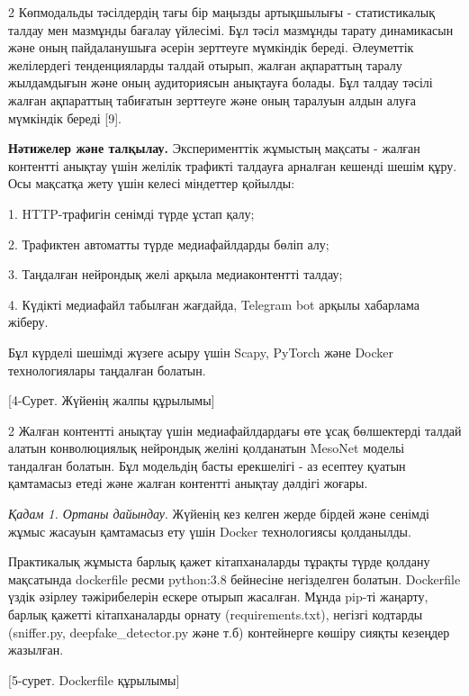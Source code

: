 \begin{multicols}{2}
Көпмодальды тәсілдердің тағы бір маңызды артықшылығы - статистикалық
талдау мен мазмұнды бағалау үйлесімі. Бұл тәсіл мазмұнды тарату
динамикасын және оның пайдаланушыға әсерін зерттеуге мүмкіндік береді.
Әлеуметтік желілердегі тенденцияларды талдай отырып, жалған ақпараттың
таралу жылдамдығын және оның аудиториясын анықтауға болады. Бұл талдау
тәсілі жалған ақпараттың табиғатын зерттеуге және оның таралуын алдын
алуға мүмкіндік береді {[}9{]}.

{\bfseries Нәтижелер және талқылау.} Эксперименттік жұмыстың мақсаты -
жалған контентті анықтау үшін желілік трафикті талдауға арналған кешенді
шешім құру. Осы мақсатқа жету үшін келесі міндеттер қойылды:

1. HTTP-трафигін сенімді түрде ұстап қалу;

2. Трафиктен автоматты түрде медиафайлдарды бөліп алу;

3. Таңдалған нейрондық желі арқыла медиаконтентті талдау;

4. Күдікті медиафайл табылған жағдайда, Telegram bot арқылы хабарлама
жіберу.

Бұл күрделі шешімді жүзеге асыру үшін Scapy, PyTorch және Docker
технологиялары таңдалған болатын.
\end{multicols}

[4-Сурет. Жүйенің жалпы құрылымы]

\begin{multicols}{2}
Жалған контентті анықтау үшін медиафайлдардағы өте ұсақ бөлшектерді
талдай алатын конволюциялық нейрондық желіні қолданатын MesoNet модельі
тандалған болатын. Бұл модельдің басты ерекшелігі - аз есептеу қуатын
қамтамасыз етеді және жалған контентті анықтау дәлдігі жоғары.

\emph{Қадам 1. Ортаны дайындау}. Жүйенің кез келген жерде бірдей және
сенімді жұмыс жасауын қамтамасыз ету үшін Docker технологиясы
қолданылды.

Практикалық жұмыста барлық қажет кітапханаларды тұрақты түрде қолдану
мақсатында dockerfile ресми python:3.8 бейнесіне негізделген болатын.
Dockerfile үздік әзірлеу тәжірибелерін ескере отырып жасалған. Мұнда
pip-ті жаңарту, барлық қажетті кітапханаларды орнату (requirements.txt),
негізгі кодтарды (sniffer.py, deepfake\_detector.py және т.б)
контейнерге көшіру сияқты кезеңдер жазылған.
\end{multicols}

[5-сурет. Dockerfile құрылымы]

